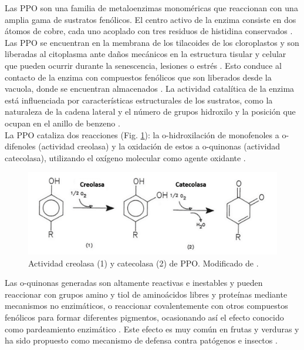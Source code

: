 Las PPO son una familia de metaloenzimas monom\'ericas que reaccionan con una amplia gama de sustratos fen\'olicos. El centro activo de la enzima consiste en dos \'atomos de cobre, cada uno acoplado con tres residuos de histidina conservados \citep{lerch1983neurospora, huber1985primary}.\\

Las PPO se encuentran en la membrana de los tilacoides de los cloroplastos  y son liberadas al citoplasma ante daños mecánicos en la estructura tisular y celular que pueden ocurrir durante la senescencia, lesiones o estr\'es \citep{marshall2000enzymatic, mayer2006polyphenol}. Esto conduce al contacto de la enzima con compuestos fen\'olicos que son liberados desde la vacuola, donde se encuentran almacenados \citep{queiroz2008polyphenol}. La actividad catal\'itica de la enzima est\'a influenciada por caracter\'isticas estructurales de los sustratos, como la naturaleza de la cadena lateral y el n\'umero de grupos hidroxilo y la posici\'on que ocupan en el anillo de benzeno \citep{macheix1990phenolic}.\\

La PPO cataliza dos reacciones (Fig. \ref{PO}): la o-hidroxilaci\'on de monofenoles a o-difenoles (actividad creolasa) y la oxidaci\'on de estos a o-quinonas (actividad catecolasa), utilizando el oxígeno molecular como agente oxidante \citep{jukanti2017distribution}.\\

\begin{figure}[hbtp]
	\centering
	\includegraphics[scale=0.65]{Imagenes/PO}
	\caption{Actividad creolasa (1) y catecolasa (2) de PPO. Modificado de \cite{nicolas1994enzymatic}. }
	\label{PO}
\end{figure}

Las o-quinonas generadas son altamente reactivas e inestables \citep{mayer2006polyphenol} y pueden reaccionar con grupos amino y tiol de aminoácidos libres y proteínas mediante mecanismos no enzimáticos, o reaccionar covalentemente con otros compuestos fenólicos para formar diferentes pigmentos, ocasionando así el efecto conocido como pardeamiento enzimático \citep{kumar2008purification}. Este efecto es muy com\'un en frutas y verduras y ha sido propuesto como mecanismo de defensa contra pat\'ogenos e insectos \citep{mayer1979polyphenol, vaughn1988polyphenol}.\\

